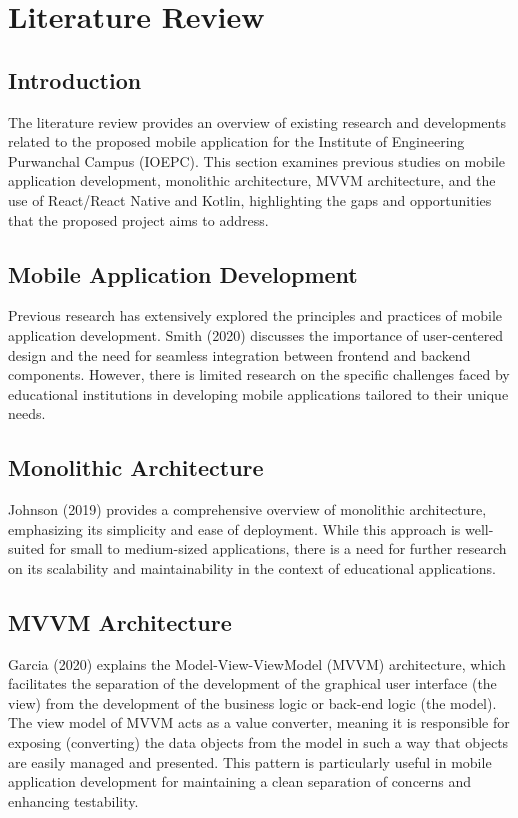 \chapter{Literature Review}

\section{Introduction}
The literature review provides an overview of existing research and developments related to the proposed mobile application for the Institute of Engineering Purwanchal Campus (IOEPC). This section examines previous studies on mobile application development, monolithic architecture, MVVM architecture, and the use of React/React Native and Kotlin, highlighting the gaps and opportunities that the proposed project aims to address.

\section{Mobile Application Development}
Previous research has extensively explored the principles and practices of mobile application development. Smith (2020) discusses the importance of user-centered design and the need for seamless integration between frontend and backend components. However, there is limited research on the specific challenges faced by educational institutions in developing mobile applications tailored to their unique needs.

\section{Monolithic Architecture}
Johnson (2019) provides a comprehensive overview of monolithic architecture, emphasizing its simplicity and ease of deployment. While this approach is well-suited for small to medium-sized applications, there is a need for further research on its scalability and maintainability in the context of educational applications.

\section{MVVM Architecture}
Garcia (2020) explains the Model-View-ViewModel (MVVM) architecture, which facilitates the separation of the development of the graphical user interface (the view) from the development of the business logic or back-end logic (the model). The view model of MVVM acts as a value converter, meaning it is responsible for exposing (converting) the data objects from the model in such a way that objects are easily managed and presented. This pattern is particularly useful in mobile application development for maintaining a clean separation of concerns and enhancing testability.

